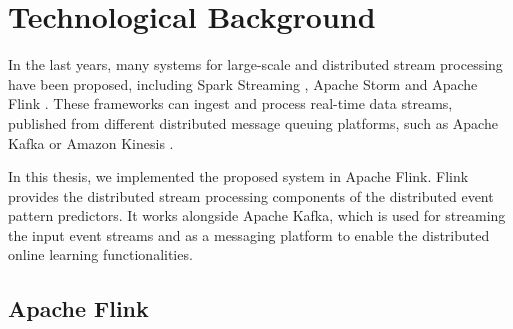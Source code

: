 \section{Technological Background}

\par In the last years, many systems for large-scale and distributed stream processing have been proposed, including Spark Streaming \cite{Spark},  Apache Storm \cite{Storm} and Apache Flink \cite{Flink}. These frameworks can ingest and process real-time data streams, published from different distributed message queuing platforms, such as Apache Kafka \cite{Kafka} or  Amazon Kinesis \cite{Kinesis}. 
\par In this thesis, we implemented the proposed system in Apache Flink. Flink provides the distributed stream processing components of the distributed event pattern predictors. It works alongside Apache Kafka, which is used for streaming the input event streams and as a messaging platform to enable the distributed online learning functionalities.





\subsection{Apache Flink}

